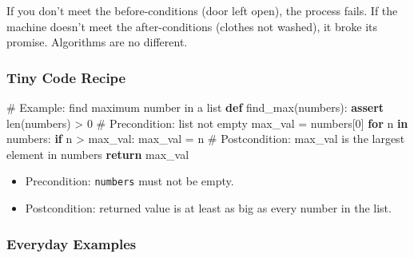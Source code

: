 \documentclass[
  letterpaper,
  DIV=11,
  numbers=noendperiod]{scrreprt}
\newenvironment{Shaded}{\begin{snugshade}}{\end{snugshade}}
\newcommand{\BuiltInTok}[1]{\textcolor[rgb]{0.00,0.23,0.31}{#1}}
\newcommand{\CommentTok}[1]{\textcolor[rgb]{0.37,0.37,0.37}{#1}}
\newcommand{\ControlFlowTok}[1]{\textcolor[rgb]{0.00,0.23,0.31}{\textbf{#1}}}
\newcommand{\DecValTok}[1]{\textcolor[rgb]{0.68,0.00,0.00}{#1}}
\newcommand{\KeywordTok}[1]{\textcolor[rgb]{0.00,0.23,0.31}{\textbf{#1}}}
\newcommand{\NormalTok}[1]{\textcolor[rgb]{0.00,0.23,0.31}{#1}}
\newcommand{\OperatorTok}[1]{\textcolor[rgb]{0.37,0.37,0.37}{#1}}
\providecommand{\tightlist}{%
  \setlength{\itemsep}{0pt}\setlength{\parskip}{0pt}}
\begin{document}
If you don't meet the before-conditions (door left open), the process
fails. If the machine doesn't meet the after-conditions (clothes not
washed), it broke its promise. Algorithms are no different.

\subsubsection{Tiny Code Recipe}\label{tiny-code-recipe-6}

\begin{Shaded}
\begin{Highlighting}[]
\CommentTok{\# Example: find maximum number in a list}
\KeywordTok{def}\NormalTok{ find\_max(numbers):}
    \ControlFlowTok{assert} \BuiltInTok{len}\NormalTok{(numbers) }\OperatorTok{\textgreater{}} \DecValTok{0}   \CommentTok{\# Precondition: list not empty}
\NormalTok{    max\_val }\OperatorTok{=}\NormalTok{ numbers[}\DecValTok{0}\NormalTok{]}
    \ControlFlowTok{for}\NormalTok{ n }\KeywordTok{in}\NormalTok{ numbers:}
        \ControlFlowTok{if}\NormalTok{ n }\OperatorTok{\textgreater{}}\NormalTok{ max\_val:}
\NormalTok{            max\_val }\OperatorTok{=}\NormalTok{ n}
    \CommentTok{\# Postcondition: max\_val is the largest element in numbers}
    \ControlFlowTok{return}\NormalTok{ max\_val}
\end{Highlighting}
\end{Shaded}

\begin{itemize}
\tightlist
\item
  Precondition: \texttt{numbers} must not be empty.
\item
  Postcondition: returned value is at least as big as every number in
  the list.
\end{itemize}

\subsubsection{Everyday Examples}\label{everyday-examples-5}
\end{document}
